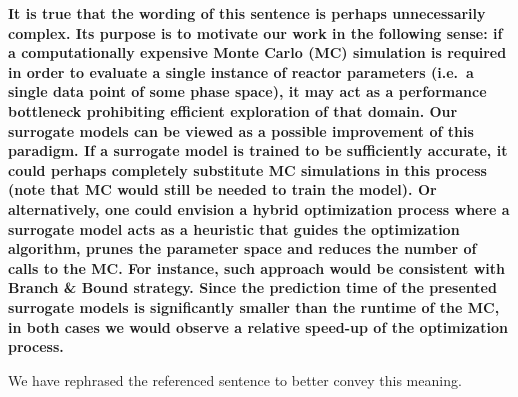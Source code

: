 \documentclass[12pt]{article}
\begin{document}
\begin{enumerate}
{\bf
	It is true that the wording of this sentence is perhaps unnecessarily
	complex. Its purpose is to motivate our work in the following sense: if a
	computationally expensive Monte Carlo (MC) simulation is required in order
	to evaluate a single instance of reactor parameters (i.e.~a single data
	point of some phase space), it may act as a performance bottleneck
	prohibiting efficient exploration of that domain. Our surrogate models can
	be viewed as a possible improvement of this paradigm. If a surrogate model
	is trained to be sufficiently accurate, it could perhaps completely
	substitute MC simulations in this process (note that MC would still be
	needed to train the model). Or alternatively, one could envision a hybrid
	optimization process where a surrogate model acts as a heuristic that guides
	the optimization algorithm, prunes the parameter space and reduces the
	number of calls to the MC. For instance, such approach would be consistent
	with Branch \& Bound strategy. Since the prediction time of the presented
	surrogate models is significantly smaller than the runtime of the MC, in
	both cases we would observe a relative speed-up of the optimization process.

	We have rephrased the referenced sentence to better convey this meaning.
}

\end{enumerate}
\end{document}

